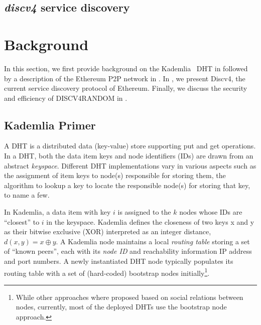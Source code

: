 
\subsection{\emph{discv4} service discovery}
\label{sec:background:dht}




\section{Background}
\label{sec:background}

In this section, we first provide background on the Kademlia~\cite{maymounkov2002kademlia} DHT in  followed by a description of the Ethereum P2P network in .  In , we present Discv4, the current service discovery protocol of Ethereum. Finally, we discuss the security and efficiency of DISCV4RANDOM in . 

\subsection{Kademlia Primer}
\label{sec:kademlia}

 A DHT is a distributed data (\ie key-value) store supporting put and get operations. In a DHT,
 both the data item keys and node identifiers (\ie IDs) are drawn from an abstract \textit{keyspace}. Different DHT implementations vary in various aspects such as the assignment of item keys to node(s) responsible for storing them, the algorithm to lookup a key to locate the responsible node(s) for storing that key, to name a few.

 In Kademlia, a data item with key $i$ is assigned to the $k$ nodes whose IDs are ``closest'' to $i$ in the keyspace. Kademlia defines the closeness of two keys x and y as their bitwise exclusive (XOR) interpreted as an integer distance, \ie $d(x,y) = x \oplus y$. A Kademlia node maintains a local \textit{routing table} storing a set of ``known peers'', each with its \textit{node ID} and reachability information \ie IP address and port numbers. A newly instantiated DHT node typically populates its routing table with a set of (hard-coded) bootstrap nodes initially\footnote{While other approaches where proposed based on social relations between nodes, currently, most of the deployed DHTs use the bootstrap node approach.}. 

